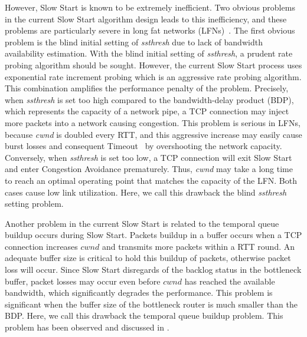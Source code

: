 \documentclass[12pt,onecolumn]{IEEEtran}
\begin{document}
However, Slow Start is known to be extremely inefficient. Two obvious problems
in the current Slow Start algorithm design leads to this inefficiency, and
these problems are particularly severe in long fat networks
(LFNs)~\cite{count1,count2}. The first obvious problem is the blind initial
setting of \emph{ssthresh} due to lack of bandwidth availability estimation.
With the blind initial setting of \emph{ssthresh}, a prudent rate probing
algorithm should be sought. However, the current Slow Start process uses
exponential rate increment probing which is an aggressive rate probing
algorithm. This combination amplifies the performance penalty of the problem.
Precisely, when \emph{ssthresh} is set too high compared to the bandwidth-delay
product (BDP), which represents the capacity of a network pipe, a TCP
connection may inject more packets into a network causing congestion. This
problem is serious in LFNs, because \emph{cwnd} is doubled every RTT, and this
aggressive increase may easily cause burst losses and consequent
Timeout~\cite{reno} by overshooting the network capacity. Conversely, when
\emph{ssthresh} is set too low, a TCP connection will exit Slow Start and enter
Congestion Avoidance prematurely. Thus, \emph{cwnd} may take a long time to
reach an optimal operating point that matches the capacity of the LFN. Both
cases cause low link utilization. Here, we call this drawback the blind
\emph{ssthresh} setting problem.
 

Another problem in the current Slow Start is related to the temporal queue
buildup occurs during Slow Start. Packets buildup in a buffer occurs when a TCP
connection increases $cwnd$ and transmits more packets within a RTT round. An
adequate buffer size is critical to hold this buildup of packets, otherwise
packet loss will occur. Since Slow Start disregards of the backlog status in
the bottleneck buffer, packet losses may occur even before $cwnd$ has reached
the available bandwidth, which significantly degrades the performance. This
problem is significant when the buffer size of the bottleneck router is much
smaller than the BDP. Here, we call this drawback the temporal queue buildup
problem. This problem has been observed and discussed in \cite{tcpw-a}.

\begin{comment}
Currently, several works have been proposed to use rate and delay measurements
to determinate the bottleneck buffer size. The works presented
in~\cite{buffer1} and~\cite{buffer3} use bottleneck link capacity estimated by
Eligible Rate Estimation\cite{westwood} and Residual Capacity
Estimator~\cite{RCE}, respectively, combined with measured RTT to infer a
buffer size. Most recently, Dispersion Delta Filtering~\cite{buffer2} proposes
to combine RTT as well as packet dispersion to give an more accurate estimation
of bottleneck buffer size. However, not many attentions have been placed on the
negative impact of small buffer. \end{comment}
\end{document}

